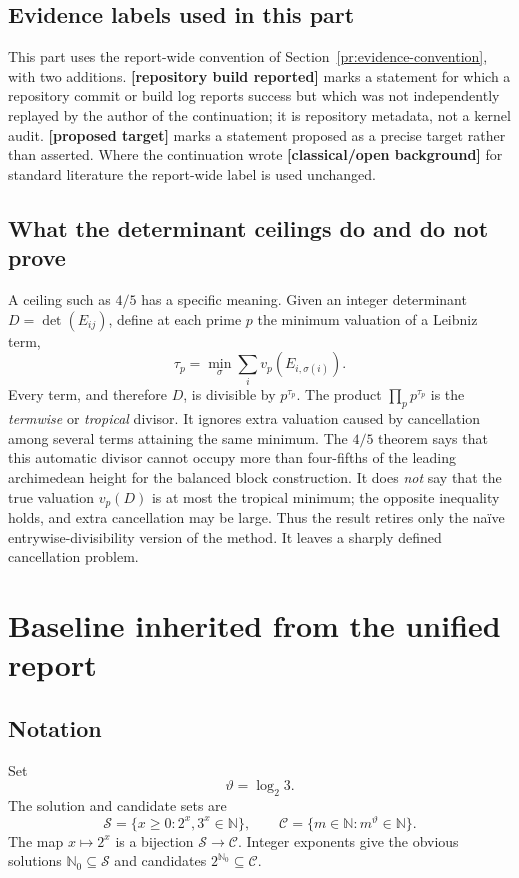 \documentclass[11pt,oneside]{article}
\theoremstyle{definition}
\theoremstyle{remark}
\newcommand{\N}{\mathbb N}
\newcommand{\Nzero}{\mathbb N_0}
\newcommand{\Sol}{\mathcal S}
\newcommand{\Cand}{\mathcal C}
\newcommand{\statusknown}{\textcolor{classicalgray}{\textbf{[classical/open background]}}}
\newcommand{\statusrepo}{\textcolor{leanblue}{\textbf{[repository build reported]}}}
\newcommand{\statusopen}{\textcolor{classicalgray}{\textbf{[proposed target]}}}
\begin{document}
\subsection{Evidence labels used in this part}

This part uses the report-wide convention of Section~\ref{pr:evidence-convention},
with two additions.  \statusrepo{} marks a statement for which a repository
commit or build log reports success but which was not independently replayed by the
author of the continuation; it is repository metadata, not a kernel audit.
\statusopen{} marks a statement proposed as a precise target rather than asserted.
Where the continuation wrote \statusknown{} for standard literature the
report-wide label is used unchanged.

\subsection{What the determinant ceilings do and do not prove}

A ceiling such as $4/5$ has a specific meaning.  Given an integer determinant
$D=\det(E_{ij})$, define at each prime $p$ the minimum valuation of a Leibniz term,
\[
  \tau_p=\min_{\sigma}\sum_i v_p(E_{i,\sigma(i)}).
\]
Every term, and therefore $D$, is divisible by $p^{\tau_p}$.  The product
$\prod_pp^{\tau_p}$ is the \emph{termwise} or \emph{tropical} divisor.  It ignores extra
valuation caused by cancellation among several terms attaining the same minimum.  The $4/5$
theorem says that this automatic divisor cannot occupy more than four-fifths of the leading
archimedean height for the balanced block construction.  It does \emph{not} say that the true
valuation $v_p(D)$ is at most the tropical minimum; the opposite inequality holds, and extra
cancellation may be large.  Thus the result retires only the naïve entrywise-divisibility
version of the method.  It leaves a sharply defined cancellation problem.

\section{Baseline inherited from the unified report}

\subsection{Notation}

Set
\[
  \vartheta=\log_2 3.
\]
The solution and candidate sets are
\[
  \Sol=\{x\ge0:2^x,3^x\in\N\},
  \qquad
  \Cand=\{m\in\N:m^{\vartheta}\in\N\}.
\]
The map $x\mapsto2^x$ is a bijection $\Sol\to\Cand$.  Integer exponents give the obvious
solutions $\Nzero\subseteq\Sol$ and candidates $2^{\Nzero}\subseteq\Cand$.
\end{document}
